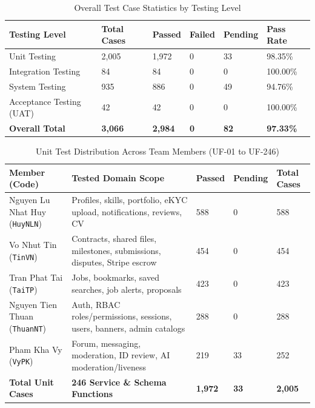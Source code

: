 \begin{table}[H]
\centering
\caption{Overall Test Case Statistics by Testing Level}\label{tab:test_overall_stats}
\renewcommand{\arraystretch}{1.32}
\setlength{\tabcolsep}{5pt}
\small
\begin{tabular}{|L{3.8cm}|C{2.0cm}|C{2.0cm}|C{1.8cm}|C{2.0cm}|C{2.4cm}|}
\hline
{}
\textbf{Testing Level} & \textbf{Total Cases} & \textbf{Passed} & \textbf{Failed} & \textbf{Pending} & \textbf{Pass Rate} \\ \hline
Unit Testing & 2,005 & 1,972 & 0 & 33 & 98.35\% \\ \hline
Integration Testing & 84 & 84 & 0 & 0 & 100.00\% \\ \hline
System Testing & 935 & 886 & 0 & 49 & 94.76\% \\ \hline
Acceptance Testing (UAT) & 42 & 42 & 0 & 0 & 100.00\% \\ \hline
{}
\textbf{Overall Total} & \textbf{3,066} & \textbf{2,984} & \textbf{0} & \textbf{82} & \textbf{97.33\%} \\ \hline
\end{tabular}
\end{table}

\begin{table}[H]
\centering
\caption{Unit Test Distribution Across Team Members (UF-01 to UF-246)}\label{tab:test_unit_members}
\renewcommand{\arraystretch}{1.32}
\setlength{\tabcolsep}{5pt}
\small
\begin{tabular}{|L{4.2cm}|L{4.2cm}|C{1.8cm}|C{1.8cm}|C{2.0cm}|}
\hline
{}
\textbf{Member (Code)} & \textbf{Tested Domain Scope} & \textbf{Passed} & \textbf{Pending} & \textbf{Total Cases} \\ \hline
Nguyen Lu Nhat Huy (\texttt{HuyNLN}) & Profiles, skills, portfolio, eKYC upload, notifications, reviews, CV & 588 & 0 & 588 \\ \hline
Vo Nhut Tin (\texttt{TinVN}) & Contracts, shared files, milestones, submissions, disputes, Stripe escrow & 454 & 0 & 454 \\ \hline
Tran Phat Tai (\texttt{TaiTP}) & Jobs, bookmarks, saved searches, job alerts, proposals & 423 & 0 & 423 \\ \hline
Nguyen Tien Thuan (\texttt{ThuanNT}) & Auth, RBAC roles/permissions, sessions, users, banners, admin catalogs & 288 & 0 & 288 \\ \hline
Pham Kha Vy (\texttt{VyPK}) & Forum, messaging, moderation, ID review, AI moderation/liveness & 219 & 33 & 252 \\ \hline
{}
\textbf{Total Unit Cases} & \textbf{246 Service \& Schema Functions} & \textbf{1,972} & \textbf{33} & \textbf{2,005} \\ \hline
\end{tabular}
\end{table}

